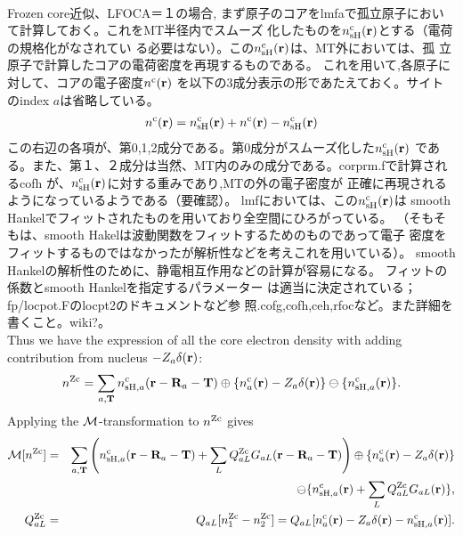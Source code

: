 \documentclass[a4paper,10pt,aip,onecolumn,amsmath,amssymb,floatfix,rmp]{revtex4-1}
\newcommand{\bfr}{{\bf r}}
\newcommand{\bfT}{{\bf T}}
\newcommand{\bfR}{{\bf R}}
\newcommand{\ooplus}{\oplus}
\newcommand{\oominus}{\ominus}
\def\nc{n^{\rm c}}
\def\nzc{n^{\rm Zc}}
\def\MM{{\cal M}}
\begin{document}
\ \\
Frozen core近似、LFOCA＝１の場合,
まず原子のコアをlmfaで孤立原子において計算しておく。これをMT半径内でスムーズ
化したものを$n^{\rm c}_{\rm sH}(\bfr)$とする（電荷の規格化がなされてい
る必要はない）。この$n^{\rm c}_{\rm sH}(\bfr)$は、MT外においては、孤
立原子で計算したコアの電荷密度を再現するものである。
これを用いて,各原子に対して、コアの電子密度$n^{\rm c}(\bfr)$
を以下の3成分表示の形であたえておく。サイトのindex $a$は省略している。
\begin{eqnarray}
n^{\rm c}(\bfr)= 
n^{\rm c}_{\rm sH}(\bfr)
+ n^{\rm c}(\bfr)- n^{\rm c}_{\rm sH}(\bfr)
\label{eq:nc}
\end{eqnarray}
この右辺の各項が、第0,1,2成分である。第0成分がスムーズ化した$n^{\rm c}_{\rm sH}(\bfr)$
である。また、第１、２成分は当然、MT内のみの成分である。corprm.fで計算されるcofh
が、$n^{\rm c}_{\rm sH}(\bfr)$に対する重みであり,MTの外の電子密度が
正確に再現されるようになっているようである（要確認）。
lmfにおいては、この$n^{\rm c}_{\rm sH}(\bfr)$は
smooth Hankelでフィットされたものを用いており全空間にひろがっている。
（そもそもは、smooth Hakelは波動関数をフィットするためのものであって電子
密度をフィットするものではなかったが解析性などを考えこれを用いている）。
smooth Hankelの解析性のために、静電相互作用などの計算が容易になる。
フィットの係数とsmooth Hankelを指定するパラメーター
は適当に決定されている；fp/locpot.Fのlocpt2のドキュメントなど参
照.cofg,cofh,ceh,rfocなど。また詳細を書くこと。wiki?。\\
  
Thus we have the expression of all the core electron density with adding
contribution from nucleus $-Z_a\delta(\bfr)$:
\begin{eqnarray}
\nzc = \sum_{a,\bfT} \nc_{{\rm sH},a}(\bfr-\bfR_a-\bfT) \ooplus
\{\nc_{a}(\bfr)-Z_a\delta(\bfr) \} \oominus \{\nc_{{\rm sH},a}(\bfr) \}.
\label{eq:nzc}
\end{eqnarray}
Applying the $\MM$-transformation to $\nzc$ gives
\begin{eqnarray}
\MM[\nzc]
&=& \sum_{a,\bfT} 
\left( \nc_{{\rm sH},a}(\bfr-\bfR_a-\bfT)+\sum_L Q_{aL}^{\rm Zc} G_{aL}(\bfr-\bfR_a-\bfT) \right)\ooplus
\{\nc_{a}(\bfr)-Z_a\delta(\bfr)\} \nonumber \\
&& \oominus \{ \nc_{{\rm sH},a}(\bfr)+\sum_L Q_{aL}^{\rm Zc}G_{aL}(\bfr)\},\label{eq:nc} \\
Q^{\rm Zc}_{aL} &=& Q_{aL}[\nzc_1-\nzc_2] =
Q_{aL}[\nc_{a}(\bfr)-Z_a\delta(\bfr)-\nc_{{\rm sH},a}(\bfr)] \label{eq:qalnzc}.
\end{eqnarray}
\end{document}
